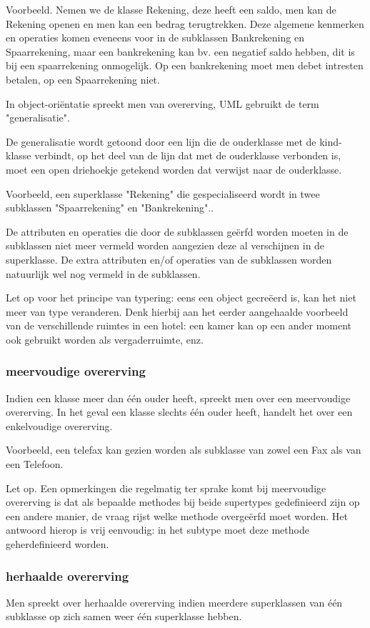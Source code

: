 Voorbeeld. Nemen we de klasse Rekening, deze heeft een saldo, men kan de Rekening openen en men kan een bedrag terugtrekken. Deze algemene kenmerken en operaties komen eveneens voor in de subklassen Bankrekening en Spaarrekening, maar een bankrekening kan bv. een negatief saldo hebben, dit is bij een spaarrekening onmogelijk. Op een bankrekening moet men debet intresten betalen, op een Spaarrekening niet.

In object-oriëntatie spreekt men van overerving, UML gebruikt de term "generalisatie".

De generalisatie wordt getoond door een lijn die de ouderklasse met de kind- klasse verbindt, op het deel van de lijn dat met de ouderklasse verbonden is, moet een open driehoekje getekend worden dat verwijst naar de ouderklasse.

Voorbeeld, een superklasse "Rekening" die gespecialiseerd wordt in twee subklassen "Spaarrekening" en "Bankrekening"..

De attributen en operaties die door de subklassen geërfd worden moeten in de subklassen niet meer vermeld worden aangezien deze al verschijnen in de superklasse. De extra attributen en/of operaties van de subklassen worden natuurlijk wel nog vermeld in de subklassen.

Let op voor het principe van typering: eens een object gecreëerd is, kan het niet meer van type veranderen. Denk hierbij aan het eerder aangehaalde voorbeeld van de verschillende ruimtes in een hotel: een kamer kan op een ander moment ook gebruikt worden als vergaderruimte, enz.
\newpage
\subsubsection{meervoudige overerving}

Indien een klasse meer dan één ouder heeft, spreekt men over een meervoudige overerving. In het geval een klasse slechts één ouder heeft, handelt het over een enkelvoudige overerving.

Voorbeeld, een telefax kan gezien worden als subklasse van zowel een Fax als van een Telefoon.

Let op. Een opmerkingen die regelmatig ter sprake komt bij meervoudige overerving is dat als bepaalde methodes bij beide supertypes gedefinieerd zijn op een andere manier, de vraag rijst welke methode overgeërfd moet worden. Het antwoord hierop is vrij eenvoudig: in het subtype moet deze methode geherdefinieerd worden.

\subsubsection{herhaalde overerving}
Men spreekt over herhaalde overerving indien meerdere superklassen van één subklasse op zich samen weer één superklasse hebben.

